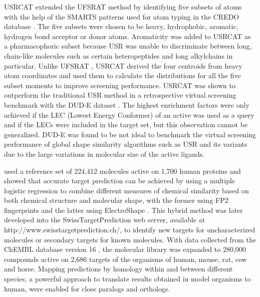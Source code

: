 USRCAT \citep{1331} extended the UFSRAT \citep{1436} method by identifying five subsets of atoms with the help of the SMARTS patterns used for atom typing in the CREDO database \citep{522}. The five subsets were chosen to be heavy, hydrophobic, aromatic, hydrogen bond acceptor or donor atoms. Aromaticity was added to USRCAT as a pharmacophoric subset because USR was unable to discriminate between long, chain-like molecules such as certain heteropeptides and long alkylchains in particular. Unlike UFSRAT \citep{1436}, USRCAT \citep{1331} derived the four centroids from heavy atom coordinates and used them to calculate the distributions for all the five subset moments to improve screening performance. USRCAT was shown to outperform the traditional USR method in a retrospective virtual screening benchmark with the DUD-E dataset \citep{1185}. The highest enrichment factors were only achieved if the LEC (Lowest Energy Conformer) of an active was used as a query and if the LECs were included in the target set, but this observation cannot be generalized. DUD-E was found to be not ideal to benchmark the virtual screening performance of global shape similarity algorithms such as USR and its variants due to the large variations in molecular size of the active ligands.

\citep{1407} used a reference set of 224,412 molecules active on 1,700 human proteins and showed that accurate target prediction can be achieved by using a multiple logistic regression to combine different measures of chemical similarity based on both chemical structure and molecular shape, with the former using FP2 fingerprints and the latter using ElectroShape \citep{1338}. This hybrid method was later developed into the SwissTargetPrediction \citep{1408} web server, available at http://www.swisstargetprediction.ch/, to identify new targets for uncharacterized molecules or secondary targets for known molecules. With data collected from the ChEMBL database version 16 \citep{1441}, the molecular library was expanded to 280,000 compounds active on 2,686 targets of the organisms of human, mouse, rat, cow and horse. Mapping predictions by homology within and between different species, a powerful approach to translate results obtained in model organisms to human, were enabled for close paralogs and orthologs.


